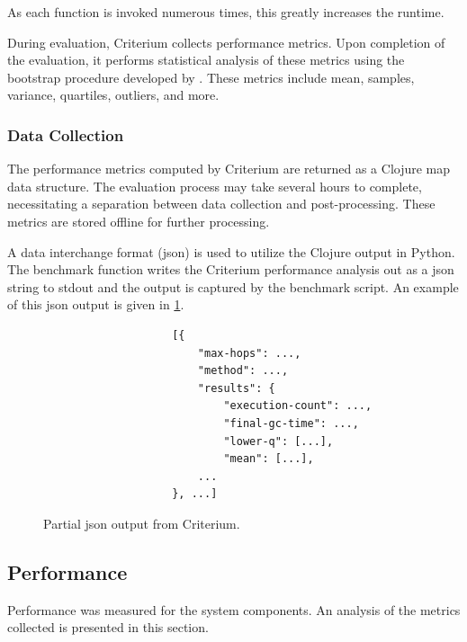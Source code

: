 			As each function is invoked numerous times, this greatly increases the runtime.
			
			During evaluation, Criterium collects performance metrics.  Upon completion of the evaluation, it performs statistical analysis of these metrics using the bootstrap procedure developed by \citeauthor{efron-87} \cite{efron-87}.  These metrics include mean, samples, variance, quartiles, outliers, and more.
		
			\subsubsection{Data Collection}
			\label{sec:data-collection}
				The performance metrics computed by Criterium are returned as a Clojure map data structure.  The evaluation process may take several hours to complete, necessitating a separation between data collection and post-processing.  These metrics are stored offline for further processing.
				
				A data interchange format (\gls{json}) is used to utilize the Clojure output in Python.  The benchmark function writes the Criterium performance analysis out as a \gls{json} string to stdout and the output is captured by the benchmark script.  An example of this \gls{json} output is given in \cref{fig:criterium-json-output}.
				
				\begin{figure}
					\centering %
					\begin{verbatim}
                    [{
                        "max-hops": ...,
                        "method": ...,
                        "results": {
                            "execution-count": ...,
                            "final-gc-time": ...,
                            "lower-q": [...],
                            "mean": [...],
                        ...
                    }, ...]
					\end{verbatim}
					
					\caption{Partial \gls{json} output from Criterium.}
					\label{fig:criterium-json-output}
				\end{figure}
		
		\subsection{Performance}
		\label{sec:performance}
			Performance was measured for the system components.  An analysis of the metrics collected is presented in this section.
			
